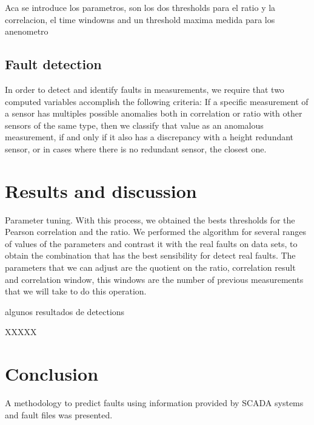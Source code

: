 \documentclass[journal]{IEEEtran}
\begin{document}
Aca se introduce los parametros, son los dos thresholds para el ratio y la correlacion, el time windowns and un threshold maxima medida para los anenometro


\subsection{Fault detection}\label{subsec:faultdetection}
In order to detect and identify faults in measurements, we require that two computed variables accomplish the following criteria: If a specific measurement of a sensor has multiples possible anomalies both in correlation or ratio with other sensors of the same type, then we classify that value as an anomalous measurement, if and only if it also has a discrepancy with a height redundant sensor, or in cases where there is no redundant sensor, the closest one.




\section{Results and discussion}\label{sec:results}
Parameter tuning.
With this process, we obtained the bests thresholds for the Pearson correlation and the ratio. We performed the algorithm for several ranges of values of the parameters and contrast it with the real faults on data sets, to obtain the combination that has the best sensibility for detect real faults. The parameters that we can adjust are the quotient on the ratio, correlation result and correlation window, this windows are the number of previous measurements that we will take to do this operation.


algunos resultados de detections


XXXXX
\section{Conclusion}\label{sec:conclusion}
A methodology to predict  faults using information provided by SCADA systems and fault files was presented.



\end{document}
